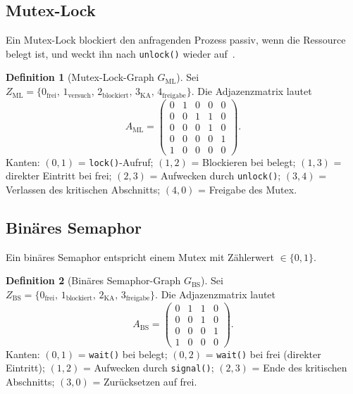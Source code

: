 ﻿\documentclass[a4paper,12pt]{article}
\theoremstyle{definition}
\newtheorem{definition}{Definition}
\begin{document}
\subsection{Mutex-Lock}

Ein Mutex-Lock blockiert den anfragenden Prozess passiv, wenn die Ressource
belegt ist, und weckt ihn nach \texttt{unlock()} wieder auf~\cite{silberschatz2018os}.

\begin{definition}[Mutex-Lock-Graph $G_{\mathrm{ML}}$]
  \label{def:ml}
  Sei $Z_{\mathrm{ML}} = \{0_{\mathrm{frei}},\, 1_{\mathrm{versuch}},\, 2_{\mathrm{blockiert}},\, 3_{\mathrm{KA}},\, 4_{\mathrm{freigabe}}\}$.
  Die Adjazenzmatrix lautet
  \[
    A_{\mathrm{ML}} =
    \begin{pmatrix}
      0 & 1 & 0 & 0 & 0 \\
      0 & 0 & 1 & 1 & 0 \\
      0 & 0 & 0 & 1 & 0 \\
      0 & 0 & 0 & 0 & 1 \\
      1 & 0 & 0 & 0 & 0
    \end{pmatrix}.
  \]
  Kanten: $(0,1)$ = \texttt{lock()}-Aufruf;
  $(1,2)$ = Blockieren bei belegt;
  $(1,3)$ = direkter Eintritt bei frei;
  $(2,3)$ = Aufwecken durch \texttt{unlock()};
  $(3,4)$ = Verlassen des kritischen Abschnitts;
  $(4,0)$ = Freigabe des Mutex.
\end{definition}

\subsection{Binäres Semaphor}

Ein binäres Semaphor entspricht einem Mutex mit Zählerwert $\in \{0,1\}$.

\begin{definition}[Binäres Semaphor-Graph $G_{\mathrm{BS}}$]
  \label{def:bs}
  Sei $Z_{\mathrm{BS}} = \{0_{\mathrm{frei}},\, 1_{\mathrm{blockiert}},\, 2_{\mathrm{KA}},\, 3_{\mathrm{freigabe}}\}$.
  Die Adjazenzmatrix lautet
  \[
    A_{\mathrm{BS}} =
    \begin{pmatrix}
      0 & 1 & 1 & 0 \\
      0 & 0 & 1 & 0 \\
      0 & 0 & 0 & 1 \\
      1 & 0 & 0 & 0
    \end{pmatrix}.
  \]
  Kanten: $(0,1)$ = \texttt{wait()} bei belegt;
  $(0,2)$ = \texttt{wait()} bei frei (direkter Eintritt);
  $(1,2)$ = Aufwecken durch \texttt{signal()};
  $(2,3)$ = Ende des kritischen Abschnitts;
  $(3,0)$ = Zurücksetzen auf frei.
\end{definition}
\end{document}
